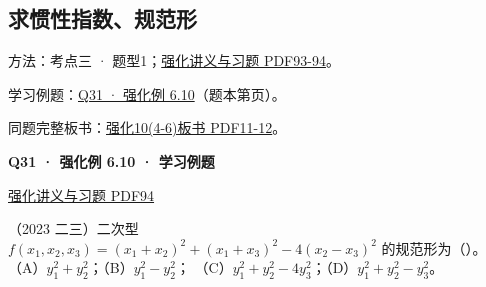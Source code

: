 \documentclass[UTF8,fontset=fandol,11pt,a4paper]{ctexart}
\newcommand{\source}[1]{{\footnotesize\color{Muted}#1\par}}
\newcommand{\qtitle}[2]{\par\needspace{5\baselineskip}\hypertarget{#1}{}\label{#1}\textbf{#2}\par}
\begin{document}
\subsection*{求惯性指数、规范形}
\hypertarget{node-B1}{}
方法：考点三 · 题型1；\href{file:///Users/skyintelligence/Desktop/\%E5\%BE\%97\%E8\%AF\%BB\%E4\%B8\%AA\%E7\%A0\%94-\%E5\%8C\%97\%E5\%A4\%A7\%E8\%BD\%AF\%E5\%BE\%AE/\%E6\%95\%B0\%E5\%AD\%A6\%20150/Kira\%C2\%B727\%E7\%BA\%BF\%E6\%80\%A7\%E4\%BB\%A3\%E6\%95\%B0\%E5\%BC\%BA\%E5\%8C\%96\%E8\%AE\%B2\%E4\%B9\%89\%2B\%E4\%B9\%A0\%E9\%A2\%98.pdf\#page=93}{强化讲义与习题 PDF93-94}。\par
学习例题：\hyperlink{R-EX-10}{Q31 · 强化例 6.10}（题本第\pageref*{R-EX-10}页）。\par
同题完整板书：\href{file:///Users/skyintelligence/Desktop/\%E5\%BE\%97\%E8\%AF\%BB\%E4\%B8\%AA\%E7\%A0\%94-\%E5\%8C\%97\%E5\%A4\%A7\%E8\%BD\%AF\%E5\%BE\%AE/\%E6\%95\%B0\%E5\%AD\%A6\%20150/\%E7\%BA\%BF\%E6\%80\%A7\%E4\%BB\%A3\%E6\%95\%B0/\%E7\%BA\%BF\%E4\%BB\%A3\%E5\%BC\%BA\%E5\%8C\%9610\%284-6\%29\%20\%20\%E7\%AC\%AC\%E5\%85\%AD\%E7\%AB\%A0\%20\%E4\%BA\%8C\%E6\%AC\%A1\%E5\%9E\%8B2\%E3\%80\%90\%E4\%BE\%8B6.5\%E3\%80\%91-\%E3\%80\%90\%E4\%BE\%8B6.13\%E3\%80\%91.pdf\#page=11}{强化10(4-6)板书 PDF11-12}。\par
\vspace{3mm}
\begin{minipage}{\linewidth}
\qtitle{R-EX-10}{Q31 · 强化例 6.10 · 学习例题}
\source{\href{file:///Users/skyintelligence/Desktop/\%E5\%BE\%97\%E8\%AF\%BB\%E4\%B8\%AA\%E7\%A0\%94-\%E5\%8C\%97\%E5\%A4\%A7\%E8\%BD\%AF\%E5\%BE\%AE/\%E6\%95\%B0\%E5\%AD\%A6\%20150/Kira\%C2\%B727\%E7\%BA\%BF\%E6\%80\%A7\%E4\%BB\%A3\%E6\%95\%B0\%E5\%BC\%BA\%E5\%8C\%96\%E8\%AE\%B2\%E4\%B9\%89\%2B\%E4\%B9\%A0\%E9\%A2\%98.pdf\#page=94}{强化讲义与习题 PDF94}}
（2023 二三）二次型 $f(x_1,x_2,x_3)=(x_1+x_2)^2+(x_1+x_3)^2-4(x_2-x_3)^2$ 的规范形为（\quad）。
（A）$y_1^2+y_2^2$；（B）$y_1^2-y_2^2$；
（C）$y_1^2+y_2^2-4y_3^2$；（D）$y_1^2+y_2^2-y_3^2$。
\end{minipage}\par\vspace{7mm}
\end{document}
